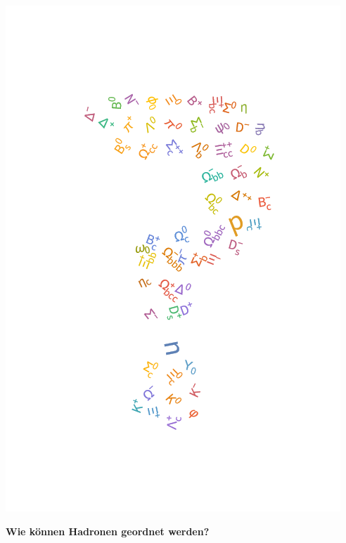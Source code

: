     \subsection{}
\begin{frame}
\begin{minipage}{.3\textwidth}
\includegraphics[width=\textwidth]{Figures Lecture on Hadrons/Hadrons_Questionmark.png}
\end{minipage}
\begin{minipage}{.69\textwidth}
\hspace{-0.5cm}\textbf{Wie können Hadronen geordnet werden?}
\end{minipage}
\end{frame}
